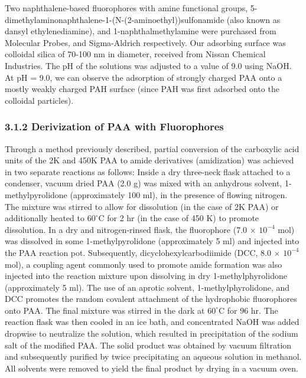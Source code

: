 \documentclass[journal=mamobx,manuscript=article]{achemso}
\begin{document}
Two naphthalene-based fluorophores with amine functional groups, 5-dimethylaminonaphthalene-1-(N-(2-aminoethyl))sulfonamide (also known as dansyl ethylenediamine), and 1-naphthalmethylamine were purchased from Molecular Probes, and Sigma-Aldrich respectively.  Our adsorbing surface was colloidal silica of 70-100 nm in diameter, received from Nissan Chemical Industries. The pH of the solutions was adjusted to a value of 9.0 using NaOH.  At pH = 9.0, we can observe the adsorption of strongly charged PAA onto a mostly weakly charged PAH surface (since PAH was first adsorbed onto the colloidal particles).

\subsubsection{3.1.2 Derivization of PAA with Fluorophores}

Through a method previously described, \cite{weber1954fluorescent,Anghel1998} partial conversion of the carboxylic acid units of the 2K and 450K PAA to amide derivatives (amidization) was achieved in two separate reactions as follows:  Inside a dry three-neck flask attached to a condenser, vacuum dried PAA (2.0 g) was mixed with an anhydrous solvent, 1-methylpyrolidone (approximately 100 ml), in the presence of flowing nitrogen.  The mixture was stirred to allow for dissolution (in the case of 2K PAA) or additionally heated to $60^{\circ}$C for 2 hr (in the case of 450 K) to promote dissolution.  In a dry and nitrogen-rinsed flask, the fluorophore (7.0 $\times$ $10^{-4}$ mol) was dissolved in some 1-methylpyrolidone (approximately 5 ml) and injected into the PAA reaction pot.  Subsequently, dicyclohexylcarbodiimide (DCC, 8.0 $\times$ $10^{-4}$ mol), a coupling agent commonly used to promote amide formation was also injected into the reaction mixture upon dissolving in dry 1-methylphyrolidone (approximately 5 ml).  The use of an aprotic solvent, 1-methylphyrolidone, and DCC promotes the random covalent attachment of the hydrophobic fluorophores onto PAA.\cite{Anghel1998}  The final mixture was stirred in the dark at $60^{\circ}$C for 96 hr.  The reaction flask was then cooled in an ice bath, and concentrated NaOH was added dropwise to neutralize the solution, which resulted in precipitation of the sodium salt of the modified PAA.  The solid product was obtained by vacuum filtration and subsequently purified by twice precipitating an aqueous solution in methanol.  All solvents were removed to yield the final product by drying in a vacuum oven.
\end{document}
